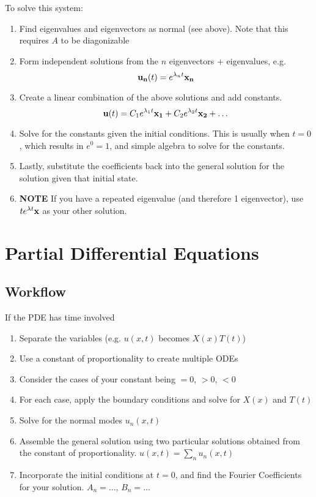 \documentclass{article}
\begin{document}
To solve this system:
\begin{enumerate}
	\item Find eigenvalues and eigenvectors as normal (see above).  Note that this requires $A$ to be diagonizable
	\item Form independent solutions from the $n$ eigenvectors + eigenvalues, e.g.
	      $$
	      \vb{u_n}(t) = e^{\lambda_n t}\vb{x_n}
	      $$
	\item Create a linear combination of the above solutions and add constants.
	      $$
	      \vb{u}(t) = C_1 e^{\lambda_1 t}\vb{x_1} + C_2 e^{\lambda_2 t}\vb{x_2} + \dots
	      $$
	\item Solve for the constants given the initial conditions.  This is usually when $t = 0$, which results in $e^{0} = 1$, and simple algebra to solve for the constants.
	\item Lastly, substitute the coefficients back into the general solution for the solution given that initial state.
	\item \textbf{NOTE} If you have a repeated eigenvalue (and therefore 1 eigenvector), use $te^{\lambda t} \vb{x}$ as your other solution.
\end{enumerate}

\section{Partial Differential Equations}
\subsection{Workflow}
If the PDE has time involved
\begin{enumerate}
	\item Separate the variables (e.g. $u(x,t)$ becomes $X(x)T(t)$)
	\item Use a constant of proportionality to create multiple ODEs 
	\item Consider the cases of your constant being $= 0$, $> 0$, $< 0$
	\item For each case, apply the boundary conditions and solve for $X(x)$ and $T(t)$
	\item Solve for the normal modes $u_n(x,t)$
	\item Assemble the general solution using two particular solutions obtained from the constant of proportionality. $u(x,t) = \sum_{n} u_n (x,t)$
	\item Incorporate the initial conditions at $t=0$, and find the Fourier Coefficients for your solution. $A_n = \dots$, $B_n = \dots$
\end{enumerate}
\end{document}
